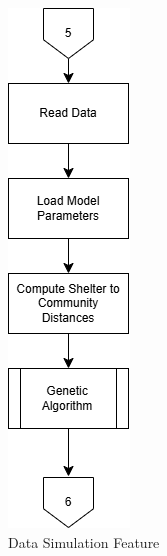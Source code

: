 \begin{appendices}
\begin{centerappendixtitle}
		\begin{figure}[h]
			\centering
			\caption{Data Simulation Feature}
			\label{simFlow}
			\includegraphics[scale=0.7]{appendix/datasim f}
		\end{figure}
		

\end{centerappendixtitle}
\end{appendices}
